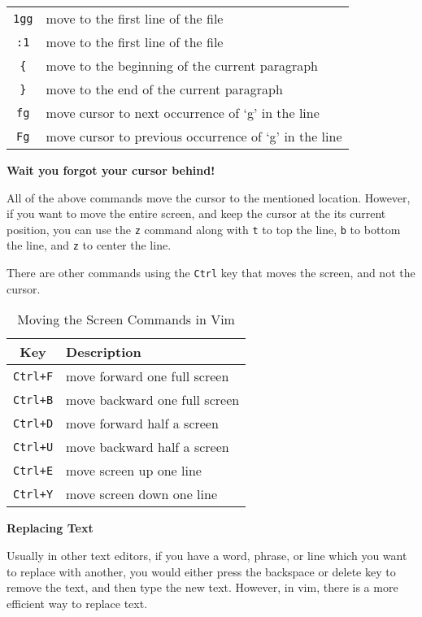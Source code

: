\begin{table*}[h!]
\begin{tabular}{c l}
    \lstinline|1gg| & move to the first line of the file \\
    \lstinline|:1| & move to the first line of the file \\
    \lstinline|{| & move to the beginning of the current paragraph \\
    \lstinline|}| & move to the end of the current paragraph \\
    \lstinline|fg| & move cursor to next occurrence of `g' in the line \\
    \lstinline|Fg| & move cursor to previous occurrence of `g' in the line \\
    \bottomrule
  \end{tabular}
\end{table*}

\textbf{Wait you forgot your cursor behind!}

All of the above commands move the cursor to the
mentioned location. However, if you want to move
the entire screen, and keep the cursor at the
its current position, you can use the \lstinline|z|
command along with \lstinline|t| to top the line,
\lstinline|b| to bottom the line, and \lstinline|z| to
center the line.

There are other commands using the \lstinline|Ctrl| key
that moves the screen, and not the cursor.

\begin{table}[h!]
  \caption{Moving the Screen Commands in Vim}
  \begin{tabular}{c l}
    \toprule
    Key & Description \\
    \midrule
    \lstinline|Ctrl+F| & move forward one full screen \\
    \lstinline|Ctrl+B| & move backward one full screen \\
    \lstinline|Ctrl+D| & move forward half a screen \\
    \lstinline|Ctrl+U| & move backward half a screen \\
    \lstinline|Ctrl+E| & move screen up one line \\
    \lstinline|Ctrl+Y| & move screen down one line \\
    \bottomrule
  \end{tabular}
\end{table}

\textbf{Replacing Text}

Usually in other text editors, if you have a word, phrase, or line
which you want to replace with another, you would either press
the backspace or delete key to remove the text, and then type
the new text. However, in vim, there is a more efficient way
to replace text.


